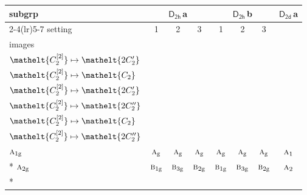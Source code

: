 \documentclass[10pt,a4paper]{article}
\numberwithin{equation}{section}
\newcommand{\eltfont}[1]{{\let\sigma\eltsigma\mathelt{#1}}}
\newcommand{\grp}[1]{\mathsf{#1}}
\newcommand{\irr}[1]{\text{\normalfont\scshape #1}}
\newcommand{\cls}[1]{\eltfont{#1}}
\newcommand{\ptag}[1]{\mathrm{#1}}
\newcommand{\clsletter}[1]{\,{\scriptsize\color{black!55}#1}}
\newcommand{\genidx}[2]{#1^{[\mathrm{#2}]}}
\begin{document}
{\small\begin{longtable}{@{}lccccccc@{}}\toprule
subgrp & \multicolumn{3}{c}{\href{D2h.pdf}{$\grp{D_{2h}}$}\clsletter{a}} & \multicolumn{3}{c}{\href{D2h.pdf}{$\grp{D_{2h}}$}\clsletter{b}} & \href{D2d.pdf}{$\grp{D_{2d}}$}\clsletter{a}\\\cmidrule(lr){2-4}\cmidrule(lr){5-7}
setting & 1 & 2 & 3 & 1 & 2 & 3 & \\
images & {\scriptsize\begin{tabular}[t]{@{}c@{}}$\cls{\genidx{C_{2}}{1}} \mapsto \cls{C_{2}}$\\$\cls{\genidx{C_{2}}{2}} \mapsto \cls{2C_{2}'}$\end{tabular}} & {\scriptsize\begin{tabular}[t]{@{}c@{}}$\cls{\genidx{C_{2}}{1}} \mapsto \cls{2C_{2}'}$\\$\cls{\genidx{C_{2}}{2}} \mapsto \cls{C_{2}}$\end{tabular}} & {\scriptsize\begin{tabular}[t]{@{}c@{}}$\cls{\genidx{C_{2}}{1}} \mapsto \cls{2C_{2}'}$\\$\cls{\genidx{C_{2}}{2}} \mapsto \cls{2C_{2}'}$\end{tabular}} & {\scriptsize\begin{tabular}[t]{@{}c@{}}$\cls{\genidx{C_{2}}{1}} \mapsto \cls{C_{2}}$\\$\cls{\genidx{C_{2}}{2}} \mapsto \cls{2C_{2}''}$\end{tabular}} & {\scriptsize\begin{tabular}[t]{@{}c@{}}$\cls{\genidx{C_{2}}{1}} \mapsto \cls{2C_{2}''}$\\$\cls{\genidx{C_{2}}{2}} \mapsto \cls{C_{2}}$\end{tabular}} & {\scriptsize\begin{tabular}[t]{@{}c@{}}$\cls{\genidx{C_{2}}{1}} \mapsto \cls{2C_{2}''}$\\$\cls{\genidx{C_{2}}{2}} \mapsto \cls{2C_{2}''}$\end{tabular}} & \\\midrule\endhead
\bottomrule\endfoot\endlastfoot
$\irr{a}_{1\ptag{g}}$ & $\irr{a}_{\ptag{g}}$ & $\irr{a}_{\ptag{g}}$ & $\irr{a}_{\ptag{g}}$ & $\irr{a}_{\ptag{g}}$ & $\irr{a}_{\ptag{g}}$ & $\irr{a}_{\ptag{g}}$ & $\irr{a}_{1}$\\*
$\irr{a}_{2\ptag{g}}$ & $\irr{b}_{1\ptag{g}}$ & $\irr{b}_{3\ptag{g}}$ & $\irr{b}_{2\ptag{g}}$ & $\irr{b}_{1\ptag{g}}$ & $\irr{b}_{3\ptag{g}}$ & $\irr{b}_{2\ptag{g}}$ & $\irr{a}_{2}$\\*

\end{longtable}}
\end{document}
